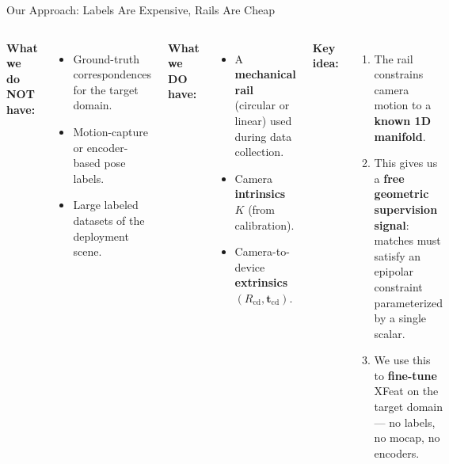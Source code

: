 \documentclass[aspectratio=169, 12pt]{beamer}
\begin{document}
\begin{frame}{Our Approach: Labels Are Expensive, Rails Are Cheap}
\small
\begin{columns}[T]
\textbf{What we do NOT have:}
\begin{itemize}\setlength{\itemsep}{2pt}
    \item[$\times$] Ground-truth correspondences for the target domain.
    \item[$\times$] Motion-capture or encoder-based pose labels.
    \item[$\times$] Large labeled datasets of the deployment scene.
\end{itemize}

\smallskip
\textbf{What we DO have:}
\begin{itemize}\setlength{\itemsep}{2pt}
    \item[$\checkmark$] A \textbf{mechanical rail} (circular or linear) used during data collection.
    \item[$\checkmark$] Camera \textbf{intrinsics} $K$ (from calibration).
    \item[$\checkmark$] Camera-to-device \textbf{extrinsics} $(R_{\mathrm{cd}}, \mathbf{t}_{\mathrm{cd}})$.
\end{itemize}

\textbf{Key idea:}
\begin{enumerate}\setlength{\itemsep}{2pt}
    \item The rail constrains camera motion to a \textbf{known 1D manifold}.
    \item This gives us a \textbf{free geometric supervision signal}:
          matches must satisfy an epipolar constraint parameterized by a single scalar.
    \item We use this to \textbf{fine-tune} XFeat on the target domain ---
          no labels, no mocap, no encoders.
\end{enumerate}
\end{columns}

\vspace{0.3em}
\begin{center}
\end{center}
\end{frame}
\end{document}
